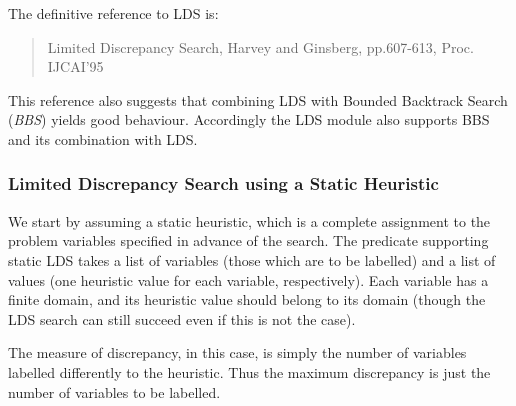 The definitive reference to LDS is:
\begin{quote}
Limited Discrepancy Search, Harvey and Ginsberg,
pp.607-613, Proc. IJCAI'95
\end{quote}

This reference also suggests that combining LDS with Bounded Backtrack
Search ({\em BBS}) yields good behaviour.  Accordingly the {\eclipse} LDS
module also supports BBS and its combination with LDS.

\subsubsection{Limited Discrepancy Search using a Static Heuristic}

We start by assuming a static heuristic, which is a complete
assignment to the problem variables specified in advance of the
search.  The predicate supporting static LDS takes a list of variables
(those which are to be labelled) and a list of values (one heuristic
value for each variable, respectively).  Each variable has a finite
domain, and its heuristic value should belong to its domain (though
the LDS search can still succeed even if this is not the case).

The measure of discrepancy, in this case, is simply the number of
variables labelled differently to the heuristic.  Thus the maximum
discrepancy is just the number of variables to be
labelled.

